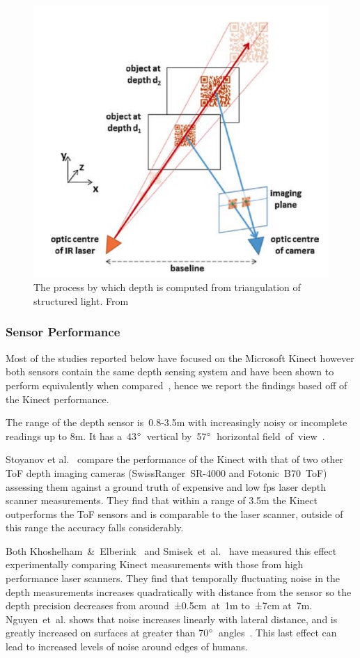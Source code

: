 \documentclass[11pt]{article} %
\begin{document}
\begin{figure}
\centering
\includegraphics*[width=0.45\linewidth,clip]{kinectMeasure}%
\caption{The process by which depth is computed from triangulation of structured light. From \cite{Han2013}		\label{fig:kinectMeasure}}
\end{figure}

\subsubsection{Sensor Performance}
\label{sec:senPerf}

Most of the studies reported below have focused on the Microsoft Kinect however both sensors contain the same depth sensing system and have been shown to perform equivalently when compared~\cite{Gonzalez-Jorge2013}, hence we report the findings based off of the Kinect performance.

The range of the depth sensor is~0.8-3.5m with increasingly noisy or incomplete readings up to 8m. It has a~43$\degree$~vertical by~57$\degree$~horizontal field~of~view~\cite{Han2013}.

Stoyanov et al.~\cite{StoyanovTodorandLouloudiAthanasiaandAndreassonHenrikandLilienthal2011a} compare the performance of the Kinect with that of two other ToF depth imaging cameras (SwissRanger~SR-4000 and Fotonic~B70~ToF) assessing them against a ground truth of expensive and low fps laser depth scanner measurements. They find that within a range of 3.5m the Kinect outperforms the ToF sensors and is comparable to the laser scanner, outside of this range the accuracy falls considerably.

Both Khoshelham~\&~Elberink~\cite{Khoshelham2012a} and Smisek~et~al.~\cite{Smisek2011} have measured this effect experimentally comparing Kinect measurements with those from high performance laser scanners. They find that temporally fluctuating noise in the depth measurements increases quadratically with distance from the sensor so the depth precision decreases from around~±0.5cm~at~1m to~±7cm at~7m. Nguyen~et~al. shows that noise increases linearly with lateral distance, and is greatly increased on surfaces at greater than 70$\degree$~angles~\cite{Nguyen2012}. This last effect can lead to increased levels of noise around edges of humans. 
\end{document}
